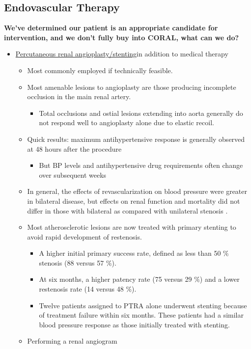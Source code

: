 \documentclass[
]{book}
\providecommand{\tightlist}{%
  \setlength{\itemsep}{0pt}\setlength{\parskip}{0pt}}
\begin{document}
\hypertarget{endovascular-therapy}{%
\subsection{Endovascular Therapy}\label{endovascular-therapy}}

\textbf{We've determined our patient is an appropriate candidate for
intervention, and we don't fully buy into CORAL, what can we do?}

\begin{itemize}
\item
  \underline{Percutaneous renal angioplasty/stenting}in addition to medical
  therapy

  \begin{itemize}
  \item
    Most commonly employed if technically feasible.
  \item
    Most amenable lesions to angioplasty are those producing
    incomplete occlusion in the main renal artery.

    \begin{itemize}
    \tightlist
    \item
      Total occlusions and ostial lesions extending into aorta
      generally do not respond well to angioplasty alone due to
      elastic recoil.
    \end{itemize}
  \item
    Quick results: maximum antihypertensive response is generally
    observed at 48 hours after the procedure

    \begin{itemize}
    \tightlist
    \item
      But BP levels and antihypertensive drug requirements often
      change over subsequent weeks
    \end{itemize}
  \item
    In general, the effects of revascularization on blood pressure
    were greater in bilateral disease, but effects on renal function
    and mortality did not differ in those with bilateral as compared
    with unilateral stenosis .
  \item
    Most atherosclerotic lesions are now treated with primary
    stenting to avoid rapid development of restenosis.

    \begin{itemize}
    \item
      A higher initial primary success rate, defined as less than
      50 \% stenosis (88 versus 57 \%).
    \item
      At six months, a higher patency rate (75 versus 29 \%) and a
      lower restenosis rate (14 versus 48 \%).
    \item
      Twelve patients assigned to PTRA alone underwent stenting
      because of treatment failure within six months. These
      patients had a similar blood pressure response as those
      initially treated with stenting.
    \end{itemize}
  \item
    Performing a renal angiogram
    \citep{edwards127RenovascularDisease2019}


\end{itemize}
\end{itemize}
\end{document}
